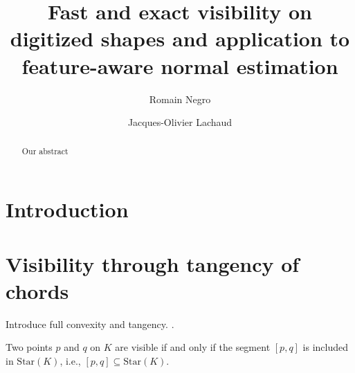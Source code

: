 \documentclass[runningheads]{llncs}
\begin{document}
%
\title{Fast and exact visibility on digitized shapes and application to feature-aware normal estimation}
%
%
    \author{Romain Negro \and
    Jacques-Olivier Lachaud}
%
%
%
    \maketitle              %
%
    \begin{abstract}
        Our abstract
    \end{abstract}



    \section{Introduction}



    \section{Visibility through tangency of chords}

    Introduce full convexity and tangency. \cite{lachaud:2021-dgmm,lachaud:2022-jmiv}.

    \begin{definition}
        Two points \( p \) and \( q \) on \( K \) are visible if and only if the segment \([p, q]\) is included in \(\text{Star}(K)\), i.e., \( [p, q] \subseteq \text{Star}(K)\).
    \end{definition}
\end{document}
